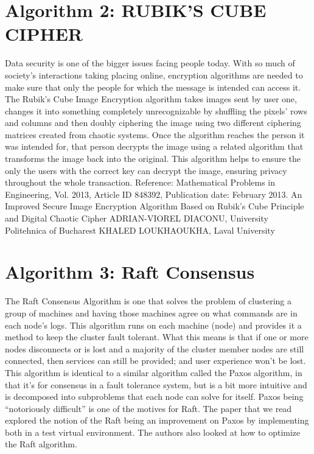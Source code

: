 \documentclass[11pt]{article}
\begin{document}
\section{Algorithm 2: RUBIK'S CUBE CIPHER}
Data security is one of the bigger issues facing people today. With so much of society's interactions taking placing online, encryption algorithms are needed to make sure that only the people for which the message is intended can access it. The Rubik's Cube Image Encryption algorithm takes images sent by user one, changes it into something completely unrecognizable by shuffling the pixels' rows and columns and then doubly ciphering the image using two different ciphering matrices created from chaotic systems. Once the algorithm reaches the person it was intended for, that person decrypts the image using a related algorithm that transforms the image back into the original. This algorithm helps to ensure the only the users with the correct key can decrypt the image, ensuring privacy throughout the whole transaction. 
Reference: Mathematical Problems in Engineering, Vol. 2013, Article ID 848392, Publication date: February 2013. An Improved Secure Image Encryption Algorithm Based on Rubik's Cube Principle and Digital Chaotic Cipher
ADRIAN-VIOREL DIACONU, University Politehnica of Bucharest
KHALED LOUKHAOUKHA, Laval University

\section{Algorithm 3: Raft Consensus}
The Raft Consensus Algorithm is one that solves the problem of clustering a group of machines and having those machines agree on what commands are in each node's logs. This algorithm runs on each machine (node) and provides it a method to keep the cluster fault tolerant. What this means is that if one or more nodes disconnects or is lost and a majority of the cluster member nodes are still connected, then services can still be provided; and user experience won’t be lost. This algorithm is identical to a similar algorithm called the Paxos algorithm, in that it’s for consensus in a fault tolerance system, but is a bit more intuitive and is decomposed into subproblems that each node can solve for itself. Paxos being “notoriously difficult” is one of the motives for Raft. The paper that we read explored the notion of the Raft being an improvement on Paxos by implementing both in a test virtual environment. The authors also looked at how to optimize the Raft algorithm.
\end{document}
